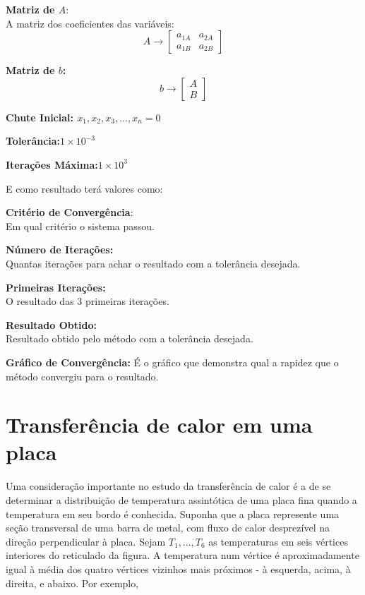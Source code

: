 \documentclass[
12pt,				%
openright,			%
twoside,			%
a4paper,			%
english,			%
french,				%
spanish,			%
brazil				%
]{abntex2_new}
\begin{document}
		\begin{alineas}
			\item{\textbf{Matriz de $A$}:\\
				A matriz dos coeficientes das variáveis:
				$$A \rightarrow   \begin{bmatrix}
				a_{1A} & a_{2A} \\
				a_{1B} & a_{2B}
				\end{bmatrix}$$}
			\item{\textbf{Matriz de $b$:}
				$$b \rightarrow  \begin{bmatrix}
				A \\
				B
				\end{bmatrix}$$
			}
			\item{\textbf{Chute Inicial: $x_1,x_2,x_3,...,x_n = 0$}\\
				
			}
			\item{\textbf{Tolerância:$1 \times 10^{-3}$}}
			\item{\textbf{Iterações Máxima:$1 \times 10^{3}$}}
		\end{alineas}
		
		E como resultado terá valores como:\\
		\begin{alineas}
			
			\item{\textbf{Critério de Convergência}:\\
				Em qual critério o sistema passou.}
			\item{\textbf{Número de Iterações:}\\
				Quantas iterações para achar o resultado com a tolerância desejada.}
			\item{\textbf{Primeiras Iterações:}\\
				O resultado das 3 primeiras iterações.}
			\item{\textbf{Resultado Obtido:}\\
				Resultado obtido pelo método com a tolerância desejada.
			}
			\item{\textbf{Gráfico de Convergência:}
				É o gráfico que demonstra qual a rapidez que o método convergiu para o
				resultado.
			}
		\end{alineas}
		
		
		\section{Transferência de calor em uma placa}
		Uma consideração importante no estudo da transferência de calor é a de
		se determinar a distribuição de temperatura assintótica de uma placa
		fina quando a temperatura em seu bordo é conhecida. Suponha que a placa
		represente uma seção transversal de uma barra de metal, com
		fluxo de calor desprezível na direção perpendicular à placa. Sejam
		$T_{1},..., T_6$ as temperaturas em seis vértices interiores do reticulado
		da figura. A temperatura num vértice é aproximadamente igual à média
		dos quatro vértices vizinhos mais próximos - à esquerda, acima, à direita,
		e abaixo. Por exemplo,\\
		
\end{document}
